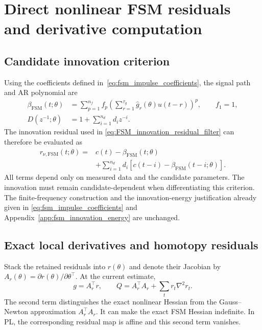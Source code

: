 \section{Direct nonlinear FSM residuals and derivative computation}
\label{app:gotham_fsm_updates}

\subsection{Candidate innovation criterion}

Using the coefficients defined in~\eqref{eq:fsm_impulse_coefficients},
the signal path and AR polynomial are
\begin{align}
\label{eq:FSM_beta_section4}
    \beta_{\mathrm{FSM}}(t;\theta)
    &=\sum_{p=1}^{n_f}f_p
       \left(\sum_{r=1}^{\tau_g}\hat g_r(\theta)u(t-r)\right)^p,
       \qquad f_1=1,\\
\label{eq:FSM_D_candidate_section4}
    D(z^{-1};\theta)&=1+\sum_{i=1}^{n_d}d_i z^{-i}.
\end{align}
The innovation residual used in
\eqref{eq:FSM_innovation_residual_filter} can therefore be evaluated as
\begin{equation}
\label{eq:FSM_innovation_expanded_section4}
\begin{aligned}
    r_{\nu,\mathrm{FSM}}(t;\theta)
    ={}&c(t)-\beta_{\mathrm{FSM}}(t;\theta)\\
       &+\sum_{i=1}^{n_d}d_i
          [c(t-i)-\beta_{\mathrm{FSM}}(t-i;\theta)].
\end{aligned}
\end{equation}
All terms depend only on measured data and the candidate parameters.
The innovation must remain candidate-dependent when differentiating
this criterion. The finite-frequency construction and the
innovation-energy justification already given in
\eqref{eq:fsm_impulse_coefficients} and
Appendix~\ref{app:fsm_innovation_energy} are unchanged.

\subsection{Exact local derivatives and homotopy residuals}

Stack the retained residuals into $r(\theta)$ and denote their Jacobian
by $A_r(\theta)=\partial r(\theta)/\partial\theta^\top$.
At the current estimate,
\begin{equation}
\label{eq:FSM_gradient_hessian_explicit}
    g=A_r^\top r,\qquad
    Q=A_r^\top A_r+\sum_t r_t\nabla^2r_t.
\end{equation}
The second term distinguishes the exact nonlinear Hessian from the
Gauss--Newton approximation $A_r^\top A_r$. It can make the exact
FSM Hessian indefinite. In PL, the corresponding residual map is
affine and this second term vanishes.

